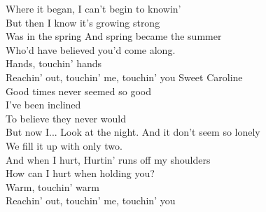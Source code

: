 \ve{}
Where it began,
I can't begin to knowin'\\
But then I know it's growing strong\\
Was in the spring
And spring became the summer\\
Who'd have believed you'd come along.\\
Hands, touchin' hands\\
Reachin' out, touchin' me, touchin' you
\cho{}
Sweet Caroline \\
Good times never seemed so good\\
I've been inclined\\
To believe they never would\\
But now I...
\ve{}
Look at the night.
And it don't seem so lonely\\
We fill it up with only two.\\
And when I hurt,
Hurtin' runs off my shoulders\\
How can I hurt when holding you?\\
Warm, touchin' warm\\
Reachin' out, touchin' me, touchin' you
\cho{}
\esong{}